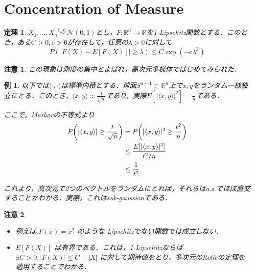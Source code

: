 \documentclass{ltjsarticle}
\theoremstyle{mystyle1}
\newtheorem{thm}[dfn]{定理}
\theoremstyle{mystyle2}
\newtheorem{example}{例}
\newtheorem{note*}{注意}
\theoremstyle{mystyle3}
\begin{document}
\section{Concentration of Measure}

\begin{thm}
    $X_1,\ldots,X_n\overset{\mathrm{i.i.d.}}{\sim}\mathcal{N}(0,1)$とし，$F:\mathbb{R}^n\to\mathbb{R}$を1-Lipschitz関数とする．このとき，ある$C>0,c>0$が存在して，任意の$\lambda>0$に対して
    \begin{equation}
        P(|F(X)-E[F(X)]|\geq\lambda)\leq C\exp(-c\lambda^2)
    \end{equation}
\end{thm}

\begin{note*}
    この現象は測度の集中とよばれ，高次元多様体ではじめてみられた．
\end{note*}

\begin{example}
    以下では$\langle\cdot,\cdot\rangle$は標準内積とする．球面$S^{n-1}\subset\mathbb{R}^n$上で$x,y$をランダム一様独立にとる．このとき，$\langle x,y\rangle\approx\frac{1}{\sqrt{n}}$であり，実際$E[|\langle x,y\rangle|^2]=\frac{1}{n}$である．

    ここで，Markovの不等式より
    \begin{equation}
        \begin{split}
            P\mleft(|\langle x,y\rangle|\geq \frac{t}{\sqrt{n}}\mright) & =P\mleft(|\langle x,y\rangle|^2\geq \frac{t^2}{n}\mright) \\
            & \leq \frac{E[|\langle x,y\rangle|^2]}{t^2/n}              \\
            & \leq\frac{1}{t^2}
        \end{split}
    \end{equation}

    これより，高次元で2つのベクトルをランダムにとれば，それらはa.s.でほぼ直交することがわかる．実際，これはsub-gaussianである．
\end{example}

\begin{note*}\,\vspace{-0.5\baselineskip}
    \begin{itemize}
        \item 例えば $F(x)=x^2$ のような Lipschitzでない関数では成立しない．
        \item $E[F(X)]$ は有界である．これは，1-Lipschitzならば $\exists C>0,|F(X)|\leq C+|X|$ に対して期待値をとり，多次元のRolleの定理を適用することでわかる．
    \end{itemize}
\end{note*}
\end{document}

